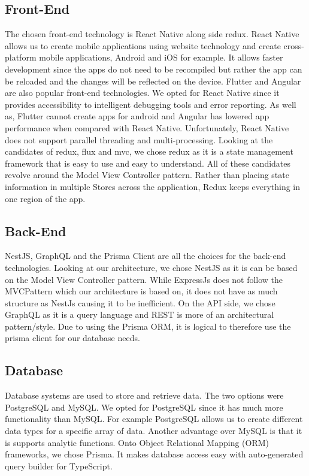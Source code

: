 \documentclass[hidelinks, 12pt, a4paper]{article}
\begin{document}
\subsection{Front-End}
The chosen front-end technology is React Native along side redux.
React Native allows us to create mobile applications using website technology and create cross-platform mobile applications, Android and iOS for example.
It allows faster development since the apps do not need to be recompiled but rather the app can be reloaded and the changes will be reflected on the device.
Flutter and Angular are also popular front-end technologies.
We opted for React Native since it provides accessibility to intelligent debugging tools and error reporting.
As well as, Flutter cannot create apps for android and Angular has lowered app performance when compared with React Native.
Unfortunately, React Native does not support parallel threading and multi-processing.
\newline
\newline
Looking at the candidates of redux, flux and mvc, we chose redux as it is a state management framework that is easy to use and easy to understand.
All of these candidates revolve around the Model View Controller pattern.
Rather than placing state information in multiple Stores across the application, Redux keeps everything in one region of the app.
\subsection{Back-End}
NestJS, GraphQL and the Prisma Client are all the choices for the back-end technologies.
Looking at our architecture, we chose NestJS as it is can be based on the Model View Controller pattern.
While ExpressJs does not follow the MVCPattern which our architecture is based on, it does not have as much structure as NestJs causing it to be inefficient.
On the API side, we chose GraphQL as it is a query language and REST is more of an architectural pattern/style.
Due to using the Prisma ORM, it is logical to therefore use the prisma client for our database needs.
\subsection{Database}
Database systems are used to store and retrieve data.
The two options were PostgreSQL and MySQL.
We opted for PostgreSQL since it has much more functionality than MySQL.
For example PostgreSQL allows us to create different data types for a specific array of data.
Another advantage over MySQL is that it is supports analytic functions.
\newline
\newline
Onto Object Relational Mapping (ORM) frameworks, we chose Prisma.
It makes database access easy with auto-generated query builder for TypeScript.
\end{document}
